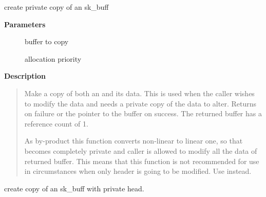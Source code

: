 \documentclass[a4paper,8pt,english]{sphinxmanual}
\begin{document}
\begin{fulllineitems}
\label{networking/kapi:c.skb_copy}
create private copy of an sk\_buff

\end{fulllineitems}


\textbf{Parameters}
\begin{description}
\item[{}] \leavevmode
buffer to copy

\item[{}] \leavevmode
allocation priority

\end{description}

\textbf{Description}
\begin{quote}

Make a copy of both an {\hyperref[networking/kapi:c.sk_buff]{\emph{}}} and its data. This is used when the
caller wishes to modify the data and needs a private copy of the
data to alter. Returns  on failure or the pointer to the buffer
on success. The returned buffer has a reference count of 1.

As by-product this function converts non-linear {\hyperref[networking/kapi:c.sk_buff]{\emph{}}} to linear
one, so that {\hyperref[networking/kapi:c.sk_buff]{\emph{}}} becomes completely private and caller is allowed
to modify all the data of returned buffer. This means that this
function is not recommended for use in circumstances when only
header is going to be modified. Use  instead.
\end{quote}

\begin{fulllineitems}
\label{networking/kapi:c.__pskb_copy_fclone}
create copy of an sk\_buff with private head.

\end{fulllineitems}
\end{document}
